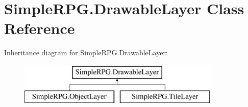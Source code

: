 \hypertarget{class_simple_r_p_g_1_1_drawable_layer}{\section{Simple\+R\+P\+G.\+Drawable\+Layer Class Reference}
\label{class_simple_r_p_g_1_1_drawable_layer}
}
Inheritance diagram for Simple\+R\+P\+G.\+Drawable\+Layer\+:\begin{figure}[H]
\begin{center}
\leavevmode
\includegraphics[height=2.000000cm]{class_simple_r_p_g_1_1_drawable_layer}
\end{center}
\end{figure}
